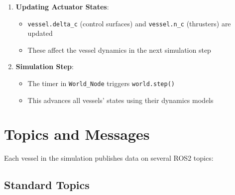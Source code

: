 \documentclass[
  letterpaper,
  DIV=11,
  numbers=noendperiod]{scrreprt}
\providecommand{\tightlist}{%
  \setlength{\itemsep}{0pt}\setlength{\parskip}{0pt}}\usepackage{longtable,booktabs,array}
\begin{document}
\begin{enumerate}
  \begin{itemize}
  \tightlist
  \item
    External nodes publish to
    \texttt{/\textless{}vessel\_name\textgreater{}\_\textless{}id\textgreater{}/actuator\_cmd}
  \item
    \texttt{actuator\_callback(msg)} processes these commands
  \end{itemize}
\item
  \textbf{Updating Actuator States}:

  \begin{itemize}
  \tightlist
  \item
    \texttt{vessel.delta\_c} (control surfaces) and \texttt{vessel.n\_c}
    (thrusters) are updated
  \item
    These affect the vessel dynamics in the next simulation step
  \end{itemize}
\item
  \textbf{Simulation Step}:

  \begin{itemize}
  \tightlist
  \item
    The timer in \texttt{World\_Node} triggers \texttt{world.step()}
  \item
    This advances all vessels' states using their dynamics models
  \end{itemize}
\end{enumerate}

\section*{Topics and Messages}\label{topics-and-messages}


Each vessel in the simulation publishes data on several ROS2 topics:

\subsection*{Standard Topics}\label{standard-topics}
\end{document}
